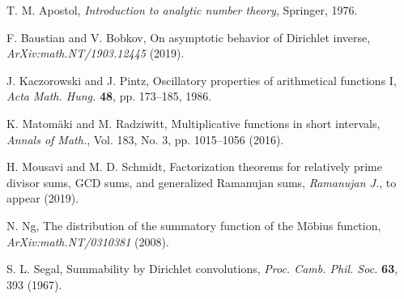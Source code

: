 \documentclass[11pt,reqno,a4letter]{article}
\numberwithin{figure}{section}
\numberwithin{table}{section}
\theoremstyle{plain}
\numberwithin{theorem}{section}
\theoremstyle{definition}
\begin{document}
\newpage
\begin{thebibliography}{10} 

T. M. Apostol, \textit{Introduction to analytic number theory}, Springer, 1976. 

F. Baustian and V. Bobkov, On asymptotic behavior of Dirichlet inverse, {\em ArXiv:math.NT/1903.12445} (2019). 

J. Kaczorowski and J. Pintz, Oscillatory properties of arithmetical 
  functions I, \emph{Acta Math. Hung.} {\bf 48}, pp. 173--185, 
  1986. 

K. Matom\"aki and M. Radziwitt, Multiplicative functions in 
  short intervals, \emph{Annals of Math.}, Vol. 183, No. 3, 
  pp. 1015--1056 (2016). 

H. Mousavi and M. D. Schmidt, Factorization theorems for relatively prime 
  divisor sums, GCD sums, and generalized {R}amanujan sums, 
  \emph{Ramanujan J.}, to appear (2019). 

N. Ng, The distribution of the summatory function of the M\"obius function, 
  \emph{ArXiv:math.NT/0310381} (2008). 

S. L. Segal, Summability by Dirichlet convolutions, 
  \emph{Proc. Camb. Phil. Soc.} \textbf{63}, 393 (1967). 

\end{thebibliography} 
\end{document}
